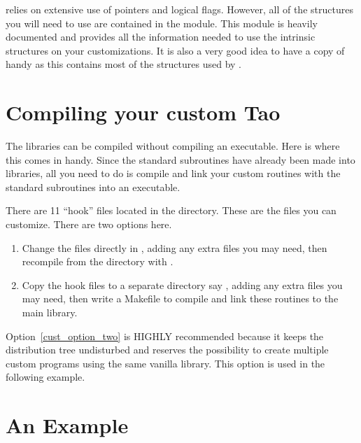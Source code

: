 \tao relies on extensive use of pointers and logical flags. However,
all of the structures you will need to use are contained in the
 module. This module is heavily documented and
provides all the information needed to use the intrinsic \tao
structures on your customizations. It is also a very good idea to have
a copy of  handy as this contains most of the
structures used by \bmad.

\section{Compiling your custom Tao}

The \tao libraries can be compiled without compiling an
executable. Here is where this comes in handy. Since the standard \tao
subroutines have already been made into libraries, all you need to do
is compile and link your custom routines with the standard \tao
subroutines into an executable.

There are 11 ``hook'' files located in the 
directory. These are the files you can customize. There are two
options here.
\begin{enumerate}
  \item Change the files directly in , adding any extra
    files you may need, then recompile from the  directory with
  .  \label{cust_option_one}
  \item Copy the hook files to a separate directory say ,
    adding any extra files you may need, then write a Makefile to 
    compile and link these
    routines to the main \tao library. \label{cust_option_two}
\end{enumerate}
Option~\ref{cust_option_two} is HIGHLY recommended because it keeps
the \tao distribution tree undisturbed and reserves the possibility to
create multiple custom \tao programs using the same vanilla \tao
library. This option is used in the following example.

\section{An Example}

